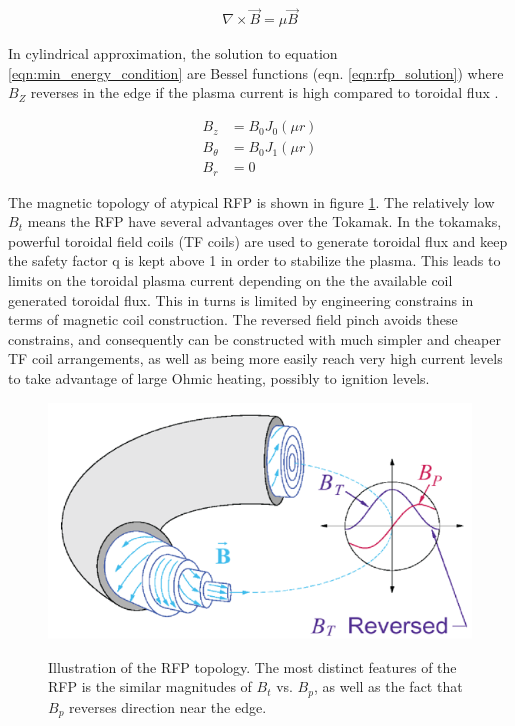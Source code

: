 \begin{refsection}
\begin{align}\label{eqn:min_energy_condition}
    \nabla \times \vec{B} = \mu \vec{B}
\end{align}

In cylindrical approximation, the solution to equation \ref{eqn:min_energy_condition} are Bessel functions (eqn. \ref{eqn:rfp_solution}) where $B_Z$ reverses in the edge if the plasma current is high compared to toroidal flux \cite{Taylor74}.

\begin{align}\label{eqn:rfp_solution}
B_z &= B_0J_0(\mu r)\\
B_\theta &= B_0 J_1(\mu r)\\
B_r & = 0
\end{align}

The magnetic topology of atypical RFP is shown in figure \ref{fig:RFP_geometry}. The relatively low $B_t$ means the RFP have several advantages over the Tokamak. In the tokamaks, powerful toroidal field coils (TF coils) are used to generate toroidal flux and keep the safety factor q is kept above 1 in order to stabilize the plasma. This leads to limits on the toroidal plasma current depending on the the available coil generated toroidal flux. This in turns is limited by engineering constrains in terms of magnetic coil construction. The reversed field pinch avoids these constrains, and
consequently can be constructed with much simpler and cheaper TF coil arrangements, as well as being more easily reach very high current levels to take advantage of large Ohmic heating, possibly to ignition levels.

\begin{figure}[!htb]
	\centering
	\includegraphics[width = 1.\linewidth]{./1_Introduction/RFP_mag_geometry.png}
	\label{fig:RFP_geometry}
	\caption[RFP magnetic topology]{Illustration of the RFP topology. The most distinct features of the RFP is the similar magnitudes of $B_t$ vs. $B_p$, as well as the fact that $B_p$ reverses direction near the edge.}
\end{figure}%


\end{refsection}
